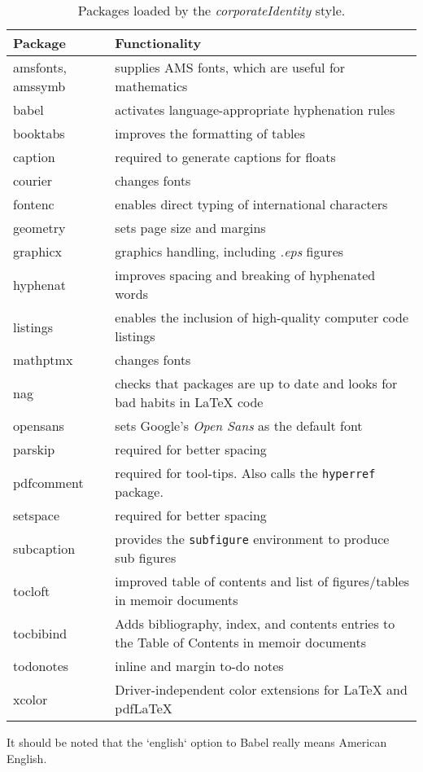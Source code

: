 \begin{table}[!ht]
\centering
\caption[Packages loaded by the corporateIdentity style]{Packages loaded by the \emph{corporateIdentity} style.}
\label{tab:incpacks}
\begin{tabular}{p{}p{}}
\toprule
Package &  Functionality\\
\midrule
amsfonts, amssymb & supplies AMS fonts, which are useful for mathematics \\
babel &  activates language-appropriate hyphenation rules\\
booktabs & improves the formatting of tables \\
caption & required to generate captions for floats\\
courier& changes fonts \\
fontenc &  enables direct typing of international characters \\
geometry & sets page size and margins \\
graphicx & graphics handling, including \emph{.eps} figures \\
hyphenat & improves spacing and breaking of hyphenated words \\
listings & enables the inclusion of high-quality computer code listings\\
mathptmx & changes fonts \\
nag & checks that packages are up to date and looks for bad habits in LaTeX code\\
opensans & sets Google's \emph{Open Sans} as the default font\\
parskip & required for better spacing\\
pdfcomment & required for tool-tips. Also calls the \texttt{hyperref} package.\\
setspace & required for better spacing\\
subcaption & provides the \texttt{subfigure} environment to produce sub figures \\
tocloft & improved table of contents and list of figures/tables in memoir documents\\
tocbibind &  Adds bibliography, index, and contents entries to the Table of Contents in memoir documents\\
todonotes &  inline and margin to-do notes \\
xcolor &  Driver-independent color extensions for LaTeX and pdfLaTeX\\
\bottomrule
\end{tabular}
\end{table}

It should be noted that the `english` option to Babel really means American English.
